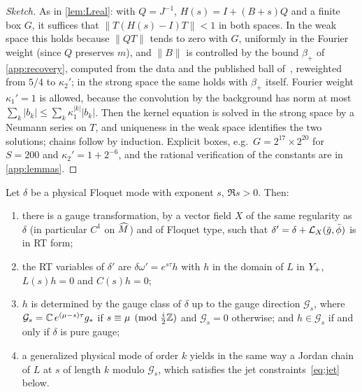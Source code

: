\begin{proof}[Sketch]
As in \cref{lem:Lreal}: with $Q=J^{-1}$, $H(s)=I+(B+s)Q$ and a finite box $G$, it suffices that
$\|T(H(s)-I)T\|<1$ in both spaces. In the weak space this holds because $\|QT\|$ tends to zero with $G$,
uniformly in the Fourier weight (since $Q$ preserves $m$), and $\|B\|$ is controlled by the bound
$\beta_+$ of \cref{app:recovery}, computed from the data and the published ball of~\cite{RT2019}, reweighted from $5/4$
to $\kappa_2'$; in the strong space the same holds with $\beta_+$ itself. Fourier weight $\kappa_1'=1$ is allowed, because the convolution by the background has
norm at most $\sum_k|b_k|\le\sum_k\kappa_1^{|k|}|b_k|$. Then the kernel equation is solved in the strong space
by a Neumann series on $T$, and uniqueness in the weak space identifies the two solutions; chains follow by
induction. Explicit boxes, e.g.\ $G=2^{17}\times2^{20}$ for $S=200$ and $\kappa_2'=1+2^{-6}$, and the
rational verification of the constants are in \cref{app:lemmas}.
\end{proof}

\begin{lemma}\label{lem:R}
Let $\delta$ be a physical Floquet mode with exponent $s$, $\Re s>0$. Then:
\begin{enumerate}[label=\textup{(\arabic*)},leftmargin=*]
\item there is a gauge transformation, by a vector field $X$ of the same regularity as $\delta$ (in
  particular $C^1$ on $\widehat M$) and of Floquet type, such that $\delta'=\delta+\mathcal{L}_X(\bar g,\bar\phi)$ is in RT
  form;
\item the RT variables of $\delta'$ are $\delta\omega'=e^{s\tau}h$ with $h$ in the domain of $L$ in $Y_{+}$,
  $L(s)h=0$ and $C(s)h=0$;
\item $h$ is determined by the gauge class of $\delta$ up to the gauge direction
  $\mathcal G_s$, where $\mathcal G_s=\mathbb{C}\,e^{(\mu-s)\tau}g_*$ if $s\equiv\mu\pmod{\tfrac i2\mathbb{Z}}$ and
  $\mathcal G_s=0$ otherwise; and $h\in\mathcal G_s$ if and only if $\delta$ is pure gauge;
\item a generalized physical mode of order $k$ yields in the same way a Jordan chain of $L$ at $s$ of length
  $k$ modulo $\mathcal G_s$, which satisfies the jet constraints~\eqref{eq:jet} below.
\end{enumerate}
\end{lemma}

